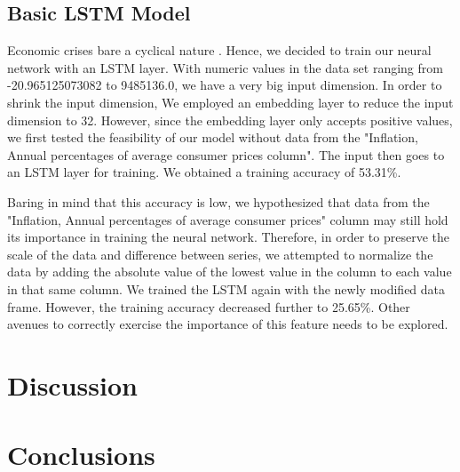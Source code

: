 \documentclass[12pt]{article}
\begin{document}
\subsection{Basic LSTM Model}
Economic crises bare a cyclical nature \cite{10.1007/978-3-030-15577-3_11}. Hence, we decided to train our neural network with an LSTM layer. With numeric values in the data set ranging from -20.965125073082 to 9485136.0, we have a very big input dimension. In order to shrink the input dimension, We employed an embedding layer to reduce the input dimension to 32. However, since the embedding layer only accepts positive values, we first tested the feasibility of our model without data from the "Inflation, Annual percentages of average consumer prices column". The input then goes to an LSTM layer for training. We obtained a training accuracy of 53.31\%.

Baring in mind that this accuracy is low, we hypothesized that data from the "Inflation, Annual percentages of average consumer prices" column may still hold its importance in training the neural network. Therefore, in order to preserve the scale of the data and difference between series, we attempted to normalize the data by adding the absolute value of the lowest value in the column to each value in that same column. We trained the LSTM again with the newly modified data frame. However, the training accuracy decreased further to 25.65\%. Other avenues to correctly exercise the importance of this feature needs to be explored. 

\section{Discussion}

\section{Conclusions}



\printbibliography
\end{document}

